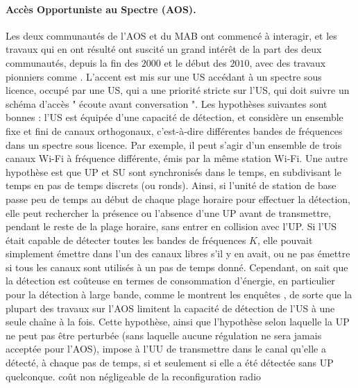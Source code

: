 \begin{resume_fr}
\paragraph{Accès Opportuniste au Spectre (AOS).}
%
Les deux communautés de l'AOS et du MAB ont commencé à interagir, et les travaux qui en ont résulté ont suscité un grand intérêt de la part des deux communautés, depuis la fin des $2000$ et le début des $2010$, avec des travaux pionniers comme \cite{Liu08,Zhao10,Jouini09,Jouini10}.
L'accent est mis sur une US accédant à un spectre sous licence, occupé par une US, qui a une priorité stricte sur l'US, qui doit suivre un schéma d'accès " écoute avant conversation ".
%
Les hypothèses suivantes sont bonnes :
l'US est équipée d'une capacité de détection,
et considère un ensemble fixe et fini de canaux orthogonaux, c'est-à-dire différentes bandes de fréquences dans un spectre sous licence.
Par exemple, il peut s'agir d'un ensemble de trois canaux Wi-Fi à fréquence différente, émis par la même station Wi-Fi.
Une autre hypothèse est que UP et SU sont synchronisés dans le temps, en subdivisant le temps en pas de temps discrets (ou ronds).
%
Ainsi, si l'unité de station de base passe peu de temps au début de chaque plage horaire pour effectuer la détection, elle peut rechercher la présence ou l'absence d'une UP avant de transmettre, pendant le reste de la plage horaire, sans entrer en collision avec l'UP.
Si l'US était capable de détecter toutes les bandes de fréquences $K$, elle pouvait simplement émettre dans l'un des canaux libres s'il y en avait, ou ne pas émettre si tous les canaux sont utilisés à un pas de temps donné.
Cependant, on sait que la détection est coûteuse en termes de consommation d'énergie, en particulier pour la détection à large bande, comme le montrent les enquêtes \cite{yucek2009survey,subhedar2011spectrum}, de sorte que la plupart des travaux sur l'AOS limitent la capacité de détection de l'US à une seule chaîne à la fois.
Cette hypothèse, ainsi que l'hypothèse selon laquelle la UP ne peut pas être perturbée (sans laquelle aucune régulation ne sera jamais acceptée pour l'AOS), impose à l'UU de transmettre dans le canal qu'elle a détecté, à chaque pas de temps, si et seulement si elle a été détectée sans UP quelconque.
coût non négligeable de la reconfiguration radio


\end{resume_fr}

